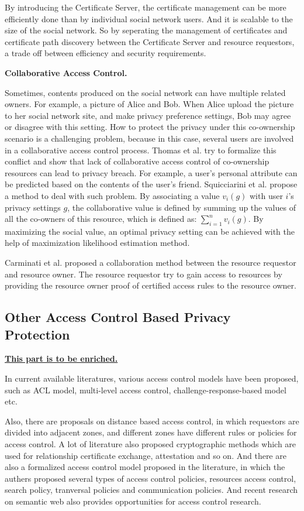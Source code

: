 \documentclass[12pt]{article}
\begin{document}
By introducing the Certificate Server, the certificate management can
be more efficiently done than by individual social network users. And it
is scalable to the size of the social network. So by seperating the
management of certificates and certificate path discovery between the
Certificate Server and resource requestors, a trade off between
efficiency and security requirements. 

\textbf{Collaborative Access Control.}

Sometimes, contents produced on the social network can have multiple
related owners. For example, a picture of Alice and Bob. When Alice
upload the picture to her social network site, and make privacy
preference settings, Bob may agree or disagree with this setting. How
to protect the privacy under this co-ownership scenario is a 
challenging problem, because in this case, several users are involved
in a collaborative access control process. Thomas et
al. \cite{unfriendly} try to formalize this conflict and show that lack
of collaborative access control of co-ownership resources can lead to
privacy breach. For example, a user's personal attribute can be
predicted based on the contents of the user's friend. Squicciarini et
al. \cite{collective_privacy} propose a method to deal with such 
problem. By associating a value $v_i(g)$ with user $i$'s privacy
settings $g$, the collaborative value is defined by summing up the values
of all the co-owners of this resource, which is defined as:
$\sum_{i=1}^nv_i(g)$. By maximizing the social value, an optimal
privacy setting can be achieved with the help of maximization likelihood
estimation method. 

Carminati et al. \cite{crypto-collaborative-ac} proposed a
collaboration method between the resource requestor and resource
owner. The resource requestor try to gain access to resources by
providing the resource owner proof of certified access rules to the
resource owner. 

\subsection{Other Access Control Based Privacy Protection}
\textbf{\underline{This part is to be enriched.}}

In current available literatures, various access control models have
been proposed, such as ACL model, multi-level access control,
challenge-response-based model etc.

Also, there are proposals on distance based access control, in which
requestors are divided into adjacent zones, and different zones have
different rules or policies for access control. 
A lot of literature also proposed cryptographic methods which are used
for relationship certificate exchange, attestation and so on. And there
are also a formalized access control model proposed in the literature,
in which the authers proposed several types of access control
policies, resources access control, search policy, tranversal policies
and communication policies. And recent research on semantic web also
provides opportunities for access control research.
\end{document}
